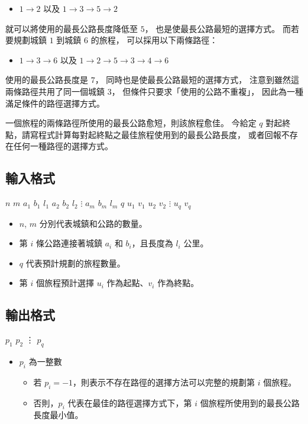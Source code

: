 \begin{itemize}
\tightlist
\item
  \(1\to 2\) 以及 \(1\to 3\to 5\to 2\)
\end{itemize}

就可以將使用的最長公路長度降低至 \(5\)， 也是使最長公路最短的選擇方式。
而若要規劃城鎮 \(1\) 到城鎮 \(6\) 的旅程， 可以採用以下兩條路徑：

\begin{itemize}
\tightlist
\item
  \(1\to 3\to 6\) 以及 \(1\to 2\to 5\to 3\to 4\to 6\)
\end{itemize}

使用的最長公路長度是 \(7\)， 同時也是使最長公路最短的選擇方式，
注意到雖然這兩條路徑共用了同一個城鎮 \(3\)，
但條件只要求「使用的公路不重複」， 因此為一種滿足條件的路徑選擇方式。

一個旅程的兩條路徑所使用的最長公路愈短，則該旅程愈佳。 今給定 \(q\)
對起終點，請寫程式計算每對起終點之最佳旅程使用到的最長公路長度，
或者回報不存在任何一種路徑的選擇方式。

\subsection{輸入格式}

\begin{format}
\f{
$n$ $m$
$a_1$ $b_1$ $l_1$
$a_2$ $b_2$ $l_2$
$\vdots$
$a_m$ $b_m$ $l_m$
$q$
$u_1$ $v_1$
$u_2$ $v_2$
$\vdots$
$u_q$ $v_q$
}
\end{format}

\begin{itemize}
\tightlist
\item
  \(n\), \(m\) 分別代表城鎮和公路的數量。
\item
  第 \(i\) 條公路連接著城鎮 \(a_i\) 和 \(b_i\)，且長度為 \(l_i\) 公里。
\item
  \(q\) 代表預計規劃的旅程數量。
\item
  第 \(i\) 個旅程預計選擇 \(u_i\) 作為起點、\(v_i\) 作為終點。
\end{itemize}

\subsection{輸出格式}

\begin{format}
\f{
$p_1$
$p_2$
\vdots
$p_q$
}
\end{format}

\begin{itemize}
\tightlist
\item
  \(p_i\) 為一整數

  \begin{itemize}
  \tightlist
  \item
    若 \(p_i = -1\)，則表示不存在路徑的選擇方法可以完整的規劃第 \(i\)
    個旅程。
  \item
    否則，\(p_i\) 代表在最佳的路徑選擇方式下，第 \(i\)
    個旅程所使用到的最長公路長度最小值。
  \end{itemize}
\end{itemize}

